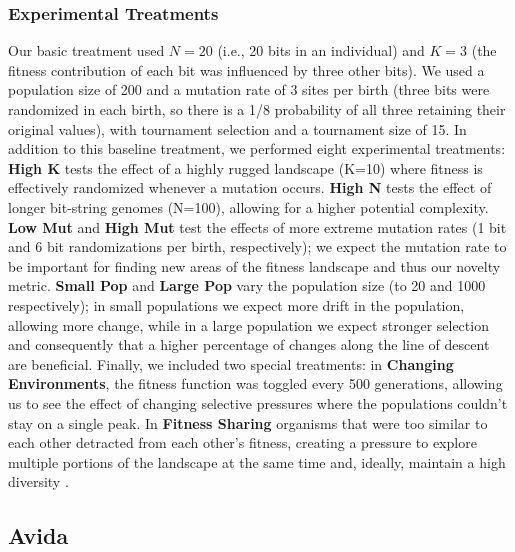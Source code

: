 \documentclass[letterpaper]{article}
\begin{document}
\subsubsection{Experimental Treatments}
Our basic treatment used $N=20$ (i.e., 20 bits in an individual) and $K=3$ (the fitness contribution of each bit was influenced by three other bits).  We used a population size of 200 and a mutation rate of 3 sites per birth (three bits were randomized in each birth, so there is a 1/8 probability of all three retaining their original values), with tournament selection and a tournament size of 15.
In addition to this baseline
treatment, we performed eight experimental treatments: \textbf{High K} tests the effect of a highly rugged landscape (K=10) where fitness is effectively randomized whenever a mutation occurs.  \textbf{High N} tests the effect of longer bit-string genomes (N=100), allowing for a higher potential complexity.  \textbf{Low Mut} and \textbf{High Mut} test the effects of more extreme mutation rates (1 bit and 6 bit randomizations per birth, respectively); we expect the mutation rate to be important for finding new areas of the fitness landscape and thus our novelty metric.  \textbf{Small Pop} and \textbf{Large Pop} vary the population size (to 20 and 1000 respectively); in small populations we expect more drift in the population, allowing more change, while in a large population we expect stronger selection and consequently that a higher percentage of changes along the line of descent are beneficial.  Finally, we included two special treatments: in \textbf{Changing Environments}, the fitness function was toggled every 500 generations, allowing us to see the effect of changing selective pressures where the populations couldn't stay on a single peak.  In \textbf{Fitness Sharing} organisms that were too similar to each other detracted from each other's fitness, creating a pressure to explore multiple portions of the landscape at the same time and, ideally, maintain a high diversity  \citep{goldberg_genetic_1987}.

\subsection{Avida}
\end{document}
